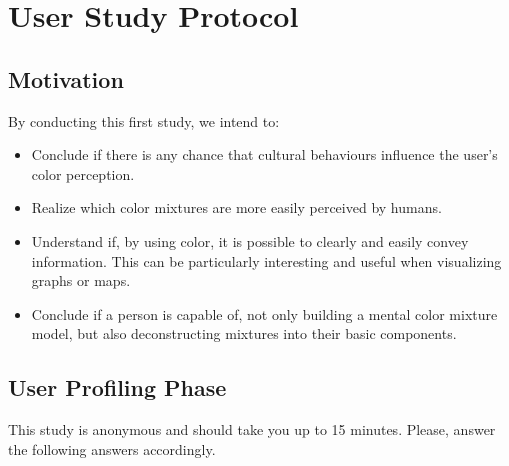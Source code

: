 
\chapter{User Study Protocol}
\label{appendix:protocol}

\section{Motivation}
%
By conducting this first study, we intend to:
%
\begin{itemize}
  \item Conclude if there is any chance that cultural behaviours influence the user's color perception.
  \item Realize which color mixtures are more easily perceived by humans.
  \item Understand if, by using color, it is possible to clearly and easily convey information.
  This can be particularly interesting and useful when visualizing graphs or maps.
  \item Conclude if a person is capable of, not only building a mental color mixture model, but
  also deconstructing mixtures into their basic components.
\end{itemize}
%
\section{User Profiling Phase}
%
This study is anonymous and should take you up to 15 minutes. Please, answer the following answers accordingly.
%
